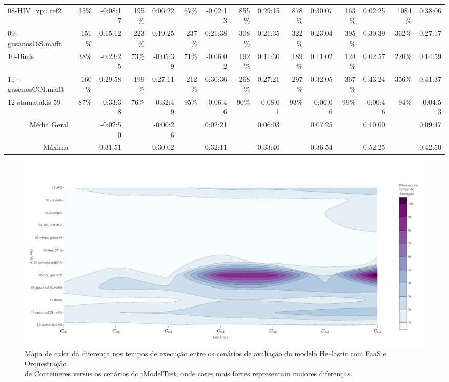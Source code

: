 \documentclass[english,brazilian]{UNISINOSmonografia} %
\begin{document}
{\begin{landscape}
\begin{table}
\begin{minipage}{\linewidth}
\begin{tabularx}{\linewidth}{@{\extracolsep{\fill}}lrrrrrrrrrrrrrr@{}}
			08-HIV\_vpu.ref2 & 35\% & -0:08:17 & 195\% & 0:06:22 & 67\% & -0:02:13 & 855\% & 0:29:15 & 878\% & 0:30:07 & 163\% & 0:02:25 & 1084\% & 0:38:06 \\
			09-gusanos16S.mafft & 151\% & 0:15:12 & 223\% & 0:19:25 & 237\% & 0:21:38 & 308\% & 0:21:35 & 322\% & 0:23:04 & 395\% & 0:30:39 & 362\% & 0:27:17 \\
			10-Birds & 38\% & -0:23:25 & 73\% & -0:05:39 & 71\% & -0:06:02 & 192\% & 0:11:30 & 189\% & 0:11:02 & 124\% & 0:02:57 & 220\% & 0:14:59 \\
			11-gusanosCOI.mafft & 160\% & 0:29:58 & 199\% & 0:27:11 & 212\% & 0:30:36 & 268\% & 0:27:21 & 297\% & 0:32:05 & 367\% & 0:43:24 & 356\% & 0:41:37 \\
			12-stamatakis-59 & 87\% & -0:33:38 & 76\% & -0:32:49 & 95\% & -0:06:46 & 90\% & -0:08:01 & 93\% & -0:06:06 & 99\% & -0:00:46 & 94\% & -0:04:53 \\ 
			\bottomrule
			\multicolumn{1}{r}{Média Geral} &  & \textcolor{success-green}{-0:02:50} &  & -0:00:26 &  & 0:02:21 &  & 0:06:03 &  & 0:07:25 &  & \textcolor{failure-red}{0:10:00} &  & 0:09:47 \\
			\multicolumn{1}{r}{Máxima} &  & 0:31:51 &  & \textcolor{success-green}{0:30:02} &  & 0:32:11 &  & 0:33:40 &  & 0:36:54 &  & \textcolor{failure-red}{0:52:25} &  & 0:42:50
		\end{tabularx}
	\end{minipage}
\end{table}


\begin{figure}[p]
	\centering%
	\begin{minipage}{.9\paperheight}
		\caption{Mapa de calor da diferença nos tempos de execução entre os cenários de avaliação do modelo \textsf{He}--lastic com FaaS e Orquestração\\ de Contêineres versus os cenários do jModelTest, onde cores mais fortes representam maiores diferenças.}
		\label{fig:results-modelo-mixed}
		\includegraphics[trim=0 20 0 60,clip,width=\textwidth]{results-modelo-mixed}
	\end{minipage}
\end{figure}


\end{landscape}
}
\end{document}
